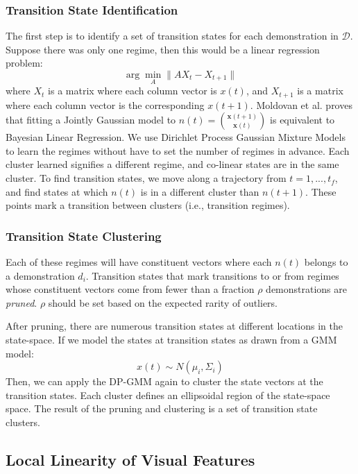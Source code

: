 \subsubsection{Transition State Identification}
The first step is to identify a set of transition states for each demonstration in $\mathcal{D}$.
Suppose there was only one regime, then this would be a linear regression problem:
\[
\arg\min_A \|A X_t - X_{t+1}\|
\]
where $X_t$ is a matrix where each column vector is $x(t)$, and $X_{t+1}$ is a matrix where each column vector is the corresponding $x(t+1)$.
Moldovan et al. \cite{moldovan2013dirichlet} proves that fitting a Jointly Gaussian model to $n(t) = \binom{\mathbf{x}(t+1)}{\mathbf{x}(t)}$ 
is equivalent to Bayesian Linear Regression.
We use Dirichlet Process Gaussian Mixture Models to learn the regimes without have to set the number of regimes in advance.
Each cluster learned signifies a different regime, and co-linear states are in the same cluster.
To find transition states, we move along a trajectory from $t=1,...,t_f$, and find states at which $n(t)$ is in a different cluster than $n(t+1)$.
These points mark a transition between clusters (i.e., transition regimes).


\subsubsection{Transition State Clustering}\label{prun}
Each of these regimes will have constituent vectors where each $n(t)$ belongs to a demonstration $d_i$. 
Transition states that mark transitions to or from regimes whose constituent vectors come from fewer than a fraction $\rho$ demonstrations are \emph{pruned}.
$\rho$ should be set based on the expected rarity of outliers.

After pruning, there are numerous transition states at different locations in the state-space.
If we model the states at transition states as drawn from a GMM model:
\[
{x}(t) \sim N(\mu_i, \Sigma_i)
\]
Then, we can apply the DP-GMM again to cluster the state vectors at the transition states.
Each cluster defines an ellipsoidal region of the state-space space.
The result of the pruning and clustering is a set of transition state clusters.
\subsection{Local Linearity of Visual Features}

